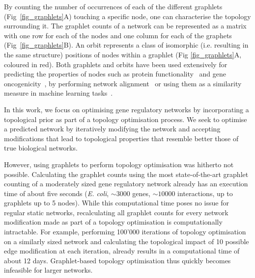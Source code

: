 By counting the number of occurrences of each of the different graphlets (Fig~\ref{fig_graphlets}A) touching a specific node, one can characterise the topology surrounding it. The graphlet counts of a network can be represented as a matrix with one row for each of the nodes and one column for each of the graphets (Fig~\ref{fig_graphlets}B). 
An orbit represents a class of isomorphic (i.e. resulting in the same structure) positions of nodes within a graphlet (Fig \ref{fig_graphlets}A, coloured in red).
Both graphlets and orbits have been used extensively for predicting the properties of nodes such as protein functionality~\cite{milenkovic_uncoveringbiologicalnetwork_2008,guerrero_characterizationproteasomeinteraction_2008,singh_graphletsignaturebasedscoring_2014} and gene oncogenicity~\cite{milenkovic_optimalnetworkalignment_2010}, by performing network alignment~\cite{kuchaiev_topologicalnetworkalignment_2010,milenkovic_globalnetworkalignment_2013} or using them as a similarity measure in machine learning tasks~\cite{shervashidze_efficientgraphletkernels_2009,vacic_graphletkernelsprediction_2010}. 


In this work, we focus on optimising gene regulatory networks by incorporating a topological prior as part of a topology optimisation process. We seek to optimise a predicted network by iteratively modifying the network and accepting modifications that lead to topological properties that resemble better those of true biological networks.

However, using graphlets to perform topology optimisation was hitherto not possible. Calculating the graphlet counts using the most state-of-the-art graphlet counting of a moderately sized gene regulatory network already has an execution time of about five seconds (\textit{E. coli}, $\sim 3000$ genes, $\sim 10000$ interactions, up to graphlets up to 5 nodes).
While this computational time poses no issue for regular static networks, recalculating all graphlet counts for every network modification made as part of a topology optimisation is computationally intractable. For example, performing 100'000 iterations of topology optimisation on a similarly sized network and calculating the topological impact of 10 possible edge modification at each iteration, already results in a computational time of about 12 days. Graphlet-based topology optimisation thus quickly becomes infeasible for larger networks.

